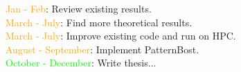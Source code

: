\documentclass[preview]{standalone}
\begin{document}
\textcolor{orange}{Jan - Feb}: Review existing results.\\\textcolor{orange}{March - July}: Find more theoretical results.\\\textcolor{orange}{March - July}: Improve existing code and run on HPC.\\\textcolor{orange}{August - September}: Implement PatternBost.\\\textcolor{lime}{October - December}: Write thesis...\\
\end{document}
